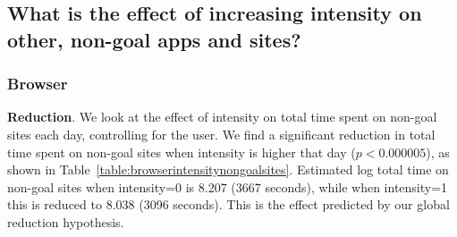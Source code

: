 \subsection{What is the effect of increasing intensity on other, non-goal apps and sites?}

\subsubsection{Browser}

\textbf{Reduction}. We look at the effect of intensity on total time spent on non-goal sites each day, controlling for the user. We find a significant reduction in total time spent on non-goal sites when intensity is higher that day ($p < 0.000005$), as shown in Table~\ref{table:browserintensitynongoalsites}. Estimated log total time on non-goal sites when intensity=0 is 8.207 (3667 seconds), while when intensity=1 this is reduced to 8.038 (3096 seconds). This is the effect predicted by our global reduction hypothesis. %







